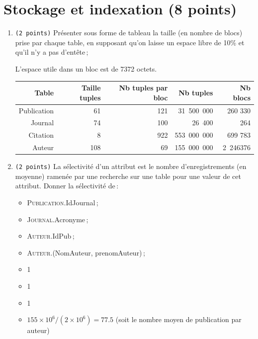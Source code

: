 \section{Stockage et indexation (8 points)}


\begin{enumerate}
	\item {\tt (2~points)} Présenter sous forme de tableau la taille (en nombre de
    blocs) prise par chaque table, en supposant qu'on laisse un espace
    libre de 10\% et qu'il n'y a pas d'entête\,;
\begin{solution}
	L'espace utile dans un bloc est de 7372 octets.\\
	\begin{tabular}{rrrrr}
\textbf{Table} & {\bf Taille tuples} 	& {\bf Nb tuples par bloc} & \textbf{Nb tuples} & {\bf Nb blocs}\\
\hline
Publication&	61 	&	121	&	31 500 000	&	260 330	\\
Journal&	74	&	100	&	26 400	&	264	\\
Citation&	8	&	922	&	553 000 000	&	699 783	\\
Auteur&	108	&	69	&	155 000 000	&	2 246376	\\
\end{tabular}
\end{solution}

	\item {\tt (2~points)} La sélectivité d'un attribut est le nombre d'enregistrements
     (en moyenne)
     ramenée par une recherche sur une table pour une valeur de
     cet attribut.  Donner la sélectivité  de\,:
	\begin{itemize}
		\item \textsc{Publication}.IdJournal\,;
		\item \textsc{Journal}.Acronyme\,;
		\item \textsc{Auteur}.IdPub\,;
		\item \textsc{Auteur}.(NomAuteur, prenomAuteur)\,;
	\end{itemize}
\begin{solution}
\begin{itemize}
	\item 1
	\item 1
	\item 1
	\item $155 \times 10^6 /(2\times 10^6) = 77.5$ (soit le nombre moyen de publication par auteur)
\end{itemize}
\end{solution}


\end{enumerate}
